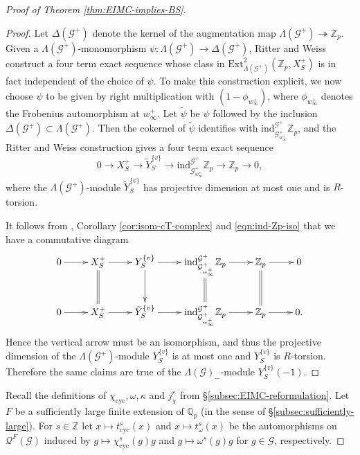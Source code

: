 \documentclass[12pt]{amsart}
\theoremstyle{plain}
\theoremstyle{remark}
\theoremstyle{definition}
\numberwithin{equation}{section}
\begin{document}
{\begin{proof}[Proof of Theorem \ref{thm:EIMC-implies-BS}]
\begin{proof}
Let $\Delta(\mathcal{G}^{+})$ denote the kernel of the augmentation map $\Lambda(\mathcal{G}^{+}) \twoheadrightarrow {\mathbb{Z}}_{p}$.
Given a $\Lambda(\mathcal{G}^{+})$-monomorphism $\psi:\Lambda(\mathcal{G}^{+}) \rightarrow \Delta(\mathcal{G}^{+})$, 
Ritter and Weiss \cite[\S 4]{MR2114937} construct a four term exact sequence whose class in 
${\mathrm{Ext}}^{2}_{\Lambda(\mathcal{G}^{+})}({\mathbb{Z}}_{p},X_{S}^{+})$ is in fact independent of the choice of $\psi$.
To make this construction explicit, we now choose $\psi$ to be given by right multiplication with $(1 - \phi_{w_{\infty}^{+}})$, 
where $\phi_{w_{\infty}^{+}}$ denotes the Frobenius automorphism at $w_{\infty}^{+}$.
Let $\tilde{\psi}$ be $\psi$ followed by the inclusion $\Delta(\mathcal{G}^{+}) \subset \Lambda(\mathcal{G}^{+})$.
Then the cokernel of $\tilde{\psi}$ identifies with ${\mathrm{ind}}_{\mathcal{G}^{+}_{w^{+}_{\infty}}}^{\mathcal{G}^{+}} {\mathbb{Z}}_{p}$, 
and the Ritter and Weiss construction gives a four term exact sequence
\[
0 \longrightarrow X_{S}^{+} \longrightarrow \tilde{Y}^{\{v\}}_{S} \longrightarrow {\mathrm{ind}}_{\mathcal{G}^{+}_{w^{+}_{\infty}}}^{\mathcal{G}^{+}} {\mathbb{Z}}_{p}
\longrightarrow {\mathbb{Z}}_{p} \longrightarrow 0,
\]
where the $\Lambda(\mathcal{G}^{+})$-module $\tilde{Y}^{\{v\}}_{S}$ has projective dimension at most one
and is $R$-torsion.

It follows from \cite[Theorem 2.4]{MR3072281}, Corollary \ref{cor:isom-cT-complex} and \eqref{eqn:ind-Zp-iso} 
that we have a commutative diagram
\[ 
\xymatrix{
{0} \ar[r] & X_{S}^{+} \ar[r] \ar@{=}[d] & Y_{S}^{\{v\}}  \ar[r] \ar[d] &
{\mathrm{ind}}_{\mathcal{G}^{+}_{w^{+}_{\infty}}}^{\mathcal{G}^{+}} {\mathbb{Z}}_{p} \ar[r] \ar@{=}[d] & {\mathbb{Z}}_{p} \ar[r] \ar@{=}[d] & 0\\
{0} \ar[r] & X_{S}^{+} \ar[r] &  \tilde{Y}^{\{v\}}_{S} \ar[r] &
{\mathrm{ind}}_{\mathcal{G}^{+}_{w^{+}_{\infty}}}^{\mathcal{G}^{+}} {\mathbb{Z}}_{p} \ar[r] &  {\mathbb{Z}}_{p} \ar[r] & 0.
}
\]
Hence the vertical arrow must be an isomorphism, and thus the projective dimension of the $\Lambda(\mathcal{G}^{+})$-module
$Y_{S}^{\{v\}}$ is at most one and $Y_{S}^{\{v\}}$ is $R$-torsion.
Therefore the same claims are true of the $\Lambda(\mathcal{G})_{-}$-module $Y_{S}^{\{v\}} (-1)$.
\end{proof}

Recall the definitions of $\chi_{\mathrm{cyc}}, \omega, \kappa$ and $j_{\chi}^{r}$
from \S \ref{subsec:EIMC-reformulation}.
Let $F$ be a sufficiently large finite extension of ${\mathbb{Q}}_{p}$ (in the sense of \S \ref{subsec:sufficiently-large}).
For $s \in {\mathbb{Z}}$ let $x \mapsto t_{\mathrm{cyc}}^{s}(x)$ and $x \mapsto t_{\omega}^{s}(x)$
be the automorphisms on $\mathcal{Q}^{F}(\mathcal{G})$ induced by 
$g \mapsto \chi_{\mathrm{cyc}}^{s}(g)g$ 
and $g \mapsto \omega^{s}(g)g$ for $g \in \mathcal{G}$, respectively. 


\end{proof}}
\end{document}
